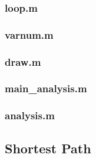 \documentclass[11pt]{scrartcl}
\begin{document}


\null
\null

\subsubsection{loop.m}



\null
\null

\subsubsection{varnum.m}



\null
\null

\subsubsection{draw.m}



\null
\null

\subsubsection{main\_analysis.m}



\null
\null

\subsubsection{analysis.m}



\null
\null

\subsection{Shortest Path}
\label{sec:shortest_path}









\end{document}
